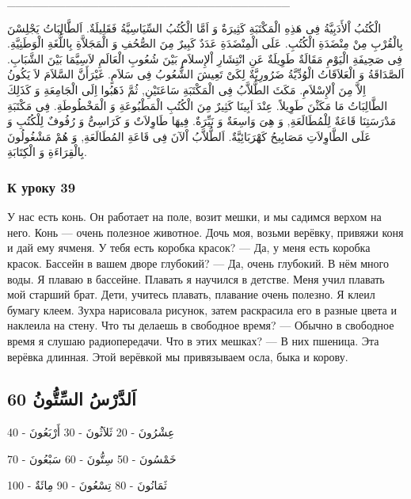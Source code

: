 \documentclass[a5paper]{article}
\begin{document}
\_\_\_\_\_\_\_\_\_\_\_\_\_\_\_\_\_\_\_\_\_\_\_\_\_\_\_\_\_\_\_\_\_\_

الْكُتُبُ اْلأَدَبِيَّةُ فِى هَذِهِ الْمَكْتَبَةِ كَثِيرَةٌ وَ اَمَّا الْكُتُبُ السِّيَاسِيَّةُ فَقَلِيلَةٌ. اَلطَّالِبَاتُ يَجْلِسْنَ بِالْقُرْبِ مِنْ مِنْضَدَةِ الْكُتُبِ. عَلَى الْمِنْضَدَةِ عَدَدٌ كَبِيرٌ مِنَ الصُّحُفِ وَ الْمَجَلاَّةِ بِاللُّغَةِ الْوَطَنِيَّةِ. فِى صَحِيفَةِ الْيَوْمِ مَقَالَةٌ طَوِيلَةٌ عَنِ انْتِشَارِ اْلإِسلاَمِ بَيْنَ شُعُوبِ الْعَالَمِ لاَسِيَّمَا بَيْنَ الشَّبَابِ. اَلصَّدَاقَةُ وَ الْعَلاَقَاتُ الْوُدِّيَّةُ ضَرُورِيَّةٌ لِكَىْ تَعِيشَ الشُّعُوبُ فِى سَلاَمٍ. غَيْرَأَنَّ السَّلاَمَ لاَ يَكُونُ اِلاَّ مِنَ اْلإِسْلاَمِ. مَكَثَ الطُّلاَّبُ فِى الْمَكْتَبَةِ سَاعَتَيْنِ, ثُمَّ ذَهَبُوا اِلَى الْجَامِعَةِ وَ كَذَلِكَ الطَّالِبَاتُ مَا مَكَثْنَ طَوِيلاً. عِنْدَ اَبِينَا كَثِيرٌ مِنَ الْكُتُبِ الْمَطْبُوعَةِ وَ الْمَخْطُوطَةِ. فِى مَكْتَبَةِ مَدْرَسَتِنَا قَاعَةٌ لِلْمُطَالَعَةِ, وَ هِىَ وَاسِعَةٌ وَ نَيِّرَةٌ. فِيهَا طَاوِلاَتٌ وَ كَرَاسِىُّ وَ رُفُوفٌ لِلْكُتُبِ وَ عَلَى الطَّاوِلاَتِ مَصَابِيحُ كَهْرَبَائِيَّةٌ. اَلطُّلاَّبُ اْلآنَ فِى قَاعَةِ المُطَالَعَةِ, وَ هُمْ مَشْغُولُونَ بِالْقِرَاءَةِ وَ الْكِتَابَةِ.

\subsubsection{К уроку 39}
У нас есть конь. Он работает на поле, возит мешки, и мы садимся верхом на него. Конь — очень полезное животное. Дочь моя, возьми верёвку, привяжи коня и дай ему ячменя. У тебя есть коробка красок? — Да, у меня есть коробка красок. Бассейн в вашем дворе глубокий? — Да, очень глубокий. В нём много воды. Я плаваю в бассейне. Плавать я научился в детстве. Меня учил плавать мой старший брат. Дети, учитесь плавать, плавание очень полезно. Я клеил бумагу клеем. Зухра нарисовала рисунок, затем раскрасила его в разные цвета и наклеила на стену. Что ты делаешь в свободное вре­мя? — Обычно в свободное время я слушаю радиопередачи. Что в этих мешках? — В них пшеница. Эта верёвка длинная. Этой верёвкой мы привязываем осла, быка и корову.

\subsection{اَلدَّرْسُ السِّتُّونُ 60}
عِشْرُونَ - 20 ثَلاَثُونَ - 30 أَرْبَعُونَ - 40 

خَمْسُونَ - 50 سِتُّونَ - 60 سَبْعُونَ - 70 

ثَمَانُونَ - 80 تِسْعُونَ - 90 مِائَةٌ - 100 
\end{document}
